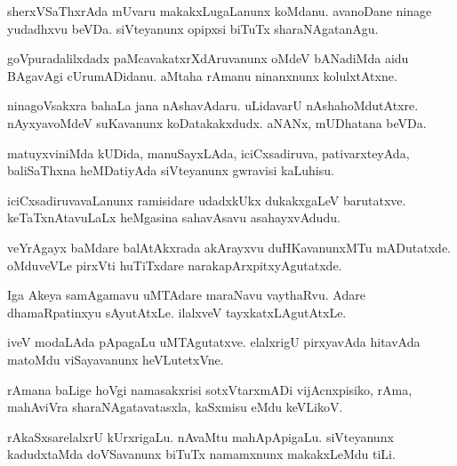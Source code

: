 \documentclass{article}
\begin{document}
\begin{mn}
sherxVSaThxrAda  mUvaru  makakxLugaLanunx  koMdanu.  avanoDane  ninage  yudadhxvu  beVDa.  siVteyanunx  opipxsi  biTuTx  sharaNAgatanAgu.  
\end{mn}

\begin{mn}
goVpuradalilxdadx  paMcavakatxrXdAruvanunx  oMdeV  bANadiMda  aidu BAgavAgi  cUrumADidanu.  aMtaha  rAmanu  ninanxnunx  kolulxtAtxne.
\end{mn}

\begin{mn}
ninagoVsakxra  bahaLa  jana  nAshavAdaru.  uLidavarU  nAshahoMdutAtxre.  nAyxyavoMdeV  suKavanunx  koDatakakxdudx.  aNANx,  mUDhatana  beVDa.
\end{mn}

\begin{mn}
matuyxviniMda  kUDida,  manuSayxLAda,  iciCxsadiruva,  pativarxteyAda,  baliSaThxna  heMDatiyAda  siVteyanunx  gwravisi  kaLuhisu.
\end{mn}

\begin{mn}
iciCxsadiruvavaLanunx  ramisidare  udadxkUkx  dukakxgaLeV  barutatxve.  keTaTxnAtavuLaLx  heMgasina  sahavAsavu  asahayxvAdudu.
\end{mn}

\begin{mn}
veYrAgayx  baMdare  balAtAkxrada  akArayxvu  duHKavanunxMTu  mADutatxde.  oMduveVLe  pirxVti  huTiTxdare  narakapArxpitxyAgutatxde.  
\end{mn}

\begin{mn}
Iga  Akeya  samAgamavu  uMTAdare  maraNavu  vaythaRvu.  Adare  dhamaRpatinxyu  sAyutAtxLe.  ilalxveV  tayxkatxLAgutAtxLe.
\end{mn}

\begin{mn}
iveV  modaLAda  pApagaLu  uMTAgutatxve.  elalxrigU  pirxyavAda  hitavAda  matoMdu  viSayavanunx  heVLutetxVne.
\end{mn}

\begin{mn}
rAmana  baLige  hoVgi  namasakxrisi  sotxVtarxmADi  vijAcnxpisiko,  rAma,  mahAviVra  sharaNAgatavatasxla,  kaSxmisu  eMdu  keVLikoV.
\end{mn}

\begin{mn}
rAkaSxsarelalxrU  kUrxrigaLu.  nAvaMtu  mahApApigaLu.  siVteyanunx  kadudxtaMda  doVSavanunx  biTuTx  namamxnunx  makakxLeMdu  tiLi.
\end{mn}
\end{document}
